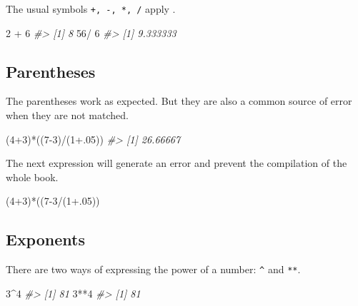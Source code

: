 \documentclass[]{book}
\newenvironment{Shaded}{}{}
\newcommand{\CommentTok}[1]{\textcolor[rgb]{0.38,0.63,0.69}{\textit{#1}}}
\newcommand{\DecValTok}[1]{\textcolor[rgb]{0.25,0.63,0.44}{#1}}
\newcommand{\FloatTok}[1]{\textcolor[rgb]{0.25,0.63,0.44}{#1}}
\newcommand{\NormalTok}[1]{#1}
\newcommand{\OperatorTok}[1]{\textcolor[rgb]{0.40,0.40,0.40}{#1}}
\newcommand{\StringTok}[1]{\textcolor[rgb]{0.25,0.44,0.63}{#1}}
\theoremstyle{definition}
\theoremstyle{definition}
\theoremstyle{definition}
\theoremstyle{remark}
\begin{document}
The usual symbols \texttt{+,\ -,\ *,\ /} apply .

\begin{Shaded}
\begin{Highlighting}[]
\DecValTok{2} \OperatorTok{+}\StringTok{ }\DecValTok{6}
\CommentTok{#> [1] 8}
\DecValTok{56}\OperatorTok{/}\StringTok{ }\DecValTok{6}
\CommentTok{#> [1] 9.333333}
\end{Highlighting}
\end{Shaded}

\hypertarget{parentheses-1}{%
\subsection{Parentheses}\label{parentheses-1}}

The parentheses work as expected. But they are also a common source of
error when they are not matched.

\begin{Shaded}
\begin{Highlighting}[]
\NormalTok{(}\DecValTok{4}\OperatorTok{+}\DecValTok{3}\NormalTok{)}\OperatorTok{*}\NormalTok{((}\DecValTok{7-3}\NormalTok{)}\OperatorTok{/}\NormalTok{(}\DecValTok{1}\FloatTok{+.05}\NormalTok{))}
\CommentTok{#> [1] 26.66667}
\end{Highlighting}
\end{Shaded}

The next expression will generate an error and prevent the compilation
of the whole book.

\begin{Shaded}
\begin{Highlighting}[]
\NormalTok{(}\DecValTok{4}\OperatorTok{+}\DecValTok{3}\NormalTok{)}\OperatorTok{*}\NormalTok{((}\DecValTok{7-3}\OperatorTok{/}\NormalTok{(}\DecValTok{1}\FloatTok{+.05}\NormalTok{))}
\end{Highlighting}
\end{Shaded}

\hypertarget{exponents-1}{%
\subsection{Exponents}\label{exponents-1}}

There are two ways of expressing the power of a number: \texttt{\^{}}
and \texttt{**}.

\begin{Shaded}
\begin{Highlighting}[]
\DecValTok{3}\OperatorTok{^}\DecValTok{4}
\CommentTok{#> [1] 81}
\DecValTok{3}\OperatorTok{**}\DecValTok{4}
\CommentTok{#> [1] 81}
\end{Highlighting}
\end{Shaded}
\end{document}
